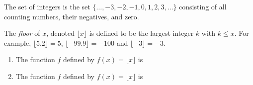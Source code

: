 \documentclass{ximera}
\author{Kenneth Berglund}
\begin{document}
\licenseSZ
\begin{exercise}
The set of integers is the set $\{\ldots, -3, -2, -1, 0, 1, 2, 3, \ldots\}$ consisting of all counting numbers, their negatives, and zero. 

The \emph{floor} of $x$, denoted $\lfloor x \rfloor$ is defined to be the largest integer $k$ with $k \le x$. For example, $\lfloor 5.2 \rfloor = 5$, $\lfloor -99.9 \rfloor = -100$ and $\lfloor -3 \rfloor = -3$.
\begin{enumerate}
\item The function $f$ defined by $f(x) = \lfloor x \rfloor$ is 
\begin{multipleChoice}
\end{multipleChoice}

\item The function $f$ defined by $f(x) = \lfloor x \rfloor$ is 
\begin{multipleChoice}
\end{multipleChoice}
\end{enumerate}
\end{exercise}
\end{document}
